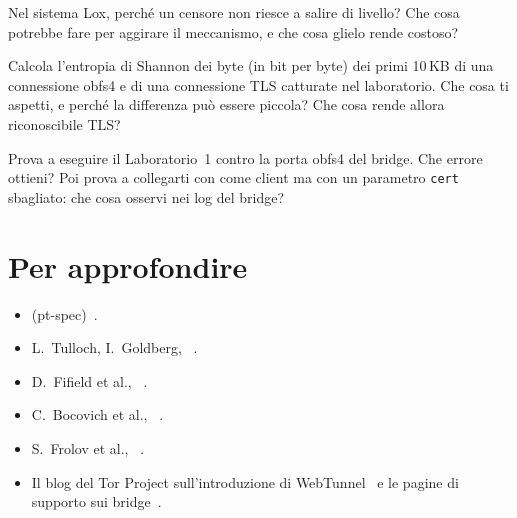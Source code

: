 \begin{esercizio}[2]\label{es:16-lox}
Nel sistema Lox, perché un censore non riesce a salire di livello? Che cosa potrebbe fare per aggirare il meccanismo, e che cosa glielo rende costoso?
\end{esercizio}

\begin{esercizio}[2]\label{es:16-entropia}
Calcola l'entropia di Shannon dei byte (in bit per byte) dei primi 10\,KB di una connessione obfs4 e di una connessione TLS catturate nel laboratorio. Che cosa ti aspetti, e perché la differenza può essere piccola? Che cosa rende allora riconoscibile TLS?
\end{esercizio}

\begin{esercizio}[3]\label{es:16-sondaggio-lab}
Prova a eseguire il Laboratorio~1 contro la porta obfs4 del bridge. Che errore ottieni? Poi prova a collegarti con  come client ma con un parametro \texttt{cert} sbagliato: che cosa osservi nei log del bridge?
\end{esercizio}

\section*{Per approfondire}
\begin{itemize}
  \item {} (pt-spec)~\cite{torspec}.
  \item L.~Tulloch, I.~Goldberg, ~\cite{tulloch2023lox}.
  \item D.~Fifield et al., ~\cite{fifield2015fronting}.
  \item C.~Bocovich et al., ~\cite{bocovich2024snowflake}.
  \item S.~Frolov et al., ~\cite{frolov2019conjure}.
  \item Il blog del Tor Project sull'introduzione di WebTunnel~\cite{torblogwebtunnel} e le pagine di supporto sui bridge~\cite{torsupport}.
\end{itemize}
